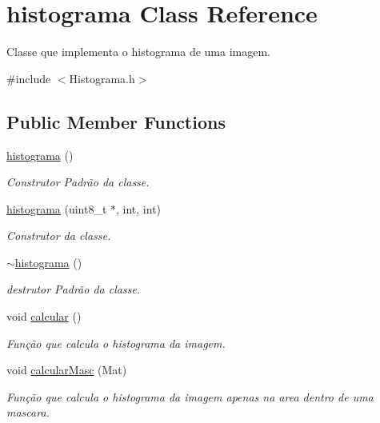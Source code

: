 \hypertarget{classhistograma}{}\section{histograma Class Reference}
\label{classhistograma}


Classe que implementa o histograma de uma imagem.  




{\ttfamily \#include $<$Histograma.\+h$>$}

\subsection*{Public Member Functions}
\begin{DoxyCompactItemize}
\item 
\mbox{\hyperlink{classhistograma_a65a071a25a8ac26d267bcee83ffe5780}{histograma}} ()
\begin{DoxyCompactList}\small\item\em Construtor Padrão da classe. \end{DoxyCompactList}\item 
\mbox{\hyperlink{classhistograma_a09adc8454f5839fc87b6e578d122897f}{histograma}} (uint8\+\_\+t $\ast$, int, int)
\begin{DoxyCompactList}\small\item\em Construtor da classe. \end{DoxyCompactList}\item 
\mbox{\hyperlink{classhistograma_a61848912cdb9a1465184999b2f49cf46}{$\sim$histograma}} ()
\begin{DoxyCompactList}\small\item\em destrutor Padrão da classe. \end{DoxyCompactList}\item 
void \mbox{\hyperlink{classhistograma_a7b1570d6a2feedd66793862d9a140d16}{calcular}} ()
\begin{DoxyCompactList}\small\item\em Função que calcula o histograma da imagem. \end{DoxyCompactList}\item 
void \mbox{\hyperlink{classhistograma_a8648881cbd8dd1fc701c8acd0022be0a}{calcular\+Masc}} (Mat)
\begin{DoxyCompactList}\small\item\em Função que calcula o histograma da imagem apenas na area dentro de uma mascara. \end{DoxyCompactList}\item 

\end{DoxyCompactItemize}
